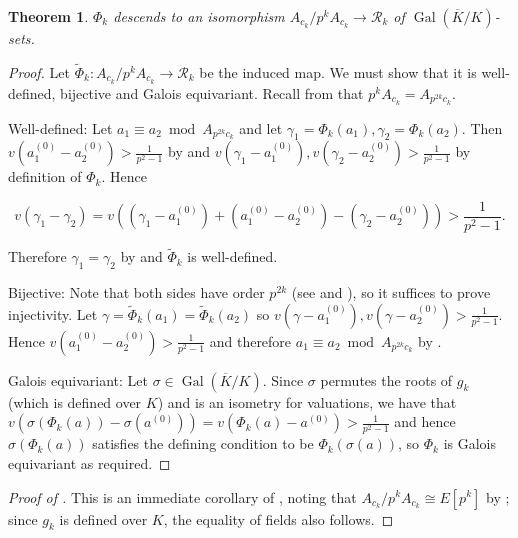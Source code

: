 \documentclass{amsart}
\newcommand{\op}[1]{\operatorname{#1}}
\newtheorem{theorem}{Theorem}
\theoremstyle{definition}
\numberwithin{theorem}{section}
\numberwithin{equation}{section}
\begin{document}
\begin{theorem}\label{thm: Phi gives pk map}
$\Phi_k$ descends to an isomorphism $A_{c_k}/p^kA_{c_k} \rightarrow \mathcal R_k$ of $\op{Gal}(\overline{K}/K)$-sets.
\end{theorem}

\begin{proof}
Let $\tilde\Phi_k: A_{c_k}/p^kA_{c_k} \to \mathcal{R}_k$ be the induced map. We must show that it is well-defined, bijective and Galois equivariant. Recall from  that $p^kA_{c_k}=A_{p^{2k}c_k}$.

Well-defined: Let $a_1 \equiv a_2 \bmod{A_{p^{2k}c_k}}$ and let $\gamma_1=\Phi_k(a_1), \gamma_2=\Phi_k(a_2)$. Then $v(a_1^{(0)}-a_2^{(0)}) > \frac{1}{p^2-1}$ by  and $v(\gamma_1-a_1^{(0)}), v(\gamma_2-a_2^{(0)}) > \frac{1}{p^2-1}$ by definition of $\Phi_k$. Hence

\[
v(\gamma_1-\gamma_2) = v((\gamma_1-a_1^{(0)}) + (a_1^{(0)}-a_2^{(0)}) -  (\gamma_2-a_2^{(0)})) > \frac{1}{p^2-1}.
\]

\noindent Therefore $\gamma_1=\gamma_2$ by  and $\tilde\Phi_k$ is well-defined.

Bijective: Note that both sides have order $p^{2k}$ (see  and ), so it suffices to prove injectivity. Let $\gamma = \tilde\Phi_k(a_1)=\tilde\Phi_k(a_2)$ so $v(\gamma-a_1^{(0)}), v(\gamma-a_2^{(0)}) > \frac{1}{p^2-1}$. Hence $v(a_1^{(0)} - a_2^{(0)}) > \frac{1}{p^2-1}$ and therefore $a_1 \equiv a_2 \bmod{A_{p^{2k}c_k}}$ by .

Galois equivariant: Let $\sigma \in \op{Gal}(\overline{K}/K)$. Since $\sigma$ permutes the roots of $g_k$ (which is defined over $K$) and is an isometry for valuations, we have that $v(\sigma(\Phi_k(a))-\sigma(a^{(0)}))=v(\Phi_{k}(a)-a^{(0)}) > \frac{1}{p^2-1}$ and hence $\sigma(\Phi_k(a))$ satisfies the defining condition to be $\Phi_k(\sigma(a))$, so $\Phi_k$ is Galois equivariant as required.
\end{proof}


\begin{proof}[Proof of ]
    This is an immediate corollary of , noting that $A_{c_k}/p^kA_{c_k} \cong E[p^k]$ by ; since $g_k$ is defined over $K$, the equality of fields also follows.
\end{proof}
\end{document}

